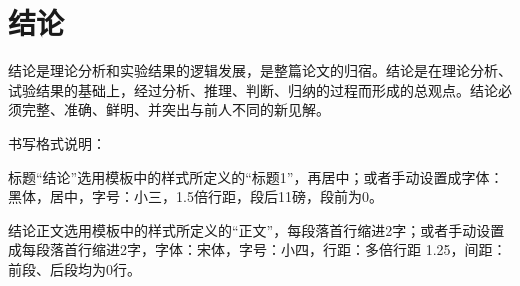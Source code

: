 \chapter*{结\quad\quad 论} %
\label{chap:conclusion}

结论是理论分析和实验结果的逻辑发展，是整篇论文的归宿。结论是在理论分析、试验结果的基础上，经过分析、推理、判断、归纳的过程而形成的总观点。结论必须完整、准确、鲜明、并突出与前人不同的新见解。

书写格式说明：

标题“结论”选用模板中的样式所定义的“标题1”，再居中；或者手动设置成字体：黑体，居中，字号：小三，1.5倍行距，段后11磅，段前为0。

结论正文选用模板中的样式所定义的“正文”，每段落首行缩进2字；或者手动设置成每段落首行缩进2字，字体：宋体，字号：小四，行距：多倍行距 1.25，间距：前段、后段均为0行。
